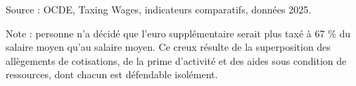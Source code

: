 Source : OCDE, Taxing Wages, indicateurs comparatifs, données 2025.\par Note : personne n'a décidé que l'euro supplémentaire serait plus taxé à 67 \% du salaire moyen qu'au salaire moyen. Ce creux résulte de la superposition des allègements de cotisations, de la prime d'activité et des aides sous condition de ressources, dont chacun est défendable isolément.
